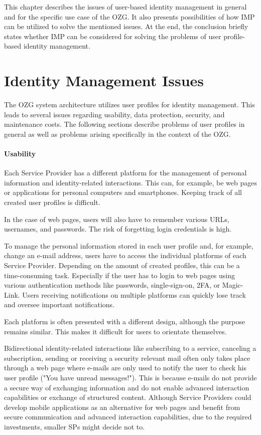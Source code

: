 This chapter describes the issues of user-based identity management in general and for the specific use case of the OZG. It also presents possibilities of how IMP can be utilized to solve the mentioned issues. At the end, the conclusion briefly states whether IMP can be considered for solving the problems of user profile-based identity management.

\section{Identity Management Issues} \label{section:identity_management_issues}

The OZG system architecture utilizes user profiles for identity management. This leads to several issues regarding usability, data protection, security, and maintenance costs. The following sections describe problems of user profiles in general as well as problems arising specifically in the context of the OZG.

\paragraph{Usability}
Each Service Provider has a different platform for the management of personal information and identity-related interactions. This can, for example, be web pages or applications for personal computers and smartphones. Keeping track of all created user profiles is difficult.

In the case of web pages, users will also have to remember various URLs, usernames, and passwords. The risk of forgetting login credentials is high.

To manage the personal information stored in each user profile and, for example, change an e-mail address, users have to access the individual platforms of each Service Provider. Depending on the amount of created profiles, this can be a time-consuming task. Especially if the user has to login to web pages using various authentication methods like passwords, single-sign-on, 2FA, or Magic-Link. Users receiving notifications on multiple platforms can quickly lose track and oversee important notifications.

Each platform is often presented with a different design, although the purpose remains similar. This makes it difficult for users to orientate themselves.

Bidirectional identity-related interactions like subscribing to a service, canceling a subscription, sending or receiving a security relevant mail often only takes place through a web page where e-mails are only used to notify the user to check his user profile ("You have unread messages!"). This is because e-mails do not provide a secure way of exchanging information and do not enable advanced interaction capabilities or exchange of structured content. Although Service Providers could develop mobile applications as an alternative for web pages and benefit from secure communication and advanced interaction capabilities, due to the required investments, smaller SPs might decide not to.

